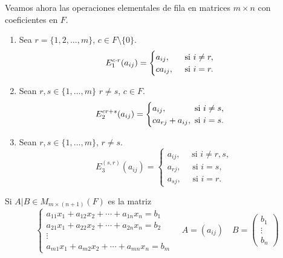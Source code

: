 \documentclass[12pt,a4paper]{book}
\begin{document}
    Veamos ahora las operaciones elementales de fila en matrices $m \times n$ con coeficientes en $F$.
    \begin{enumerate}
        \item Sea $r=\{1,2,\dots,m\}$, $c\in F\setminus\{0\}$.
        \begin{equation*}
            E_{1}^{c\cdot r}(a_{ij})=
            \begin{cases}
                a_{ij},\hfill\text{ si }i\neq r,\\
                ca_{ij},\quad\text{ si }i=r.
            \end{cases}
        \end{equation*} 
        \item Sean $r,s\in\{1,\dots,m\}$ $r\neq s$, $c\in F$.
        \begin{equation*}
            E_{2}^{cr+s}(a_{ij})=
            \begin{cases}
                a_{ij},\hfill\text{ si }i\neq s,\\
                ca_{rj}+a_{ij},\text{ si }i=s.
            \end{cases}
        \end{equation*}
        \item Sean $r,s\in\{1,\dots,m\}$, $r\neq s$.
        \begin{equation*}
            E_{3}^{(s,r)}(a_{ij})=
            \begin{cases}
                a_{ij},\quad\text{ si }i\neq r,s,\\
                a_{rj},\quad\text{ si }i=s,\\
                a_{sj},\quad\text{ si }i=r.
            \end{cases}
        \end{equation*}
    \end{enumerate}
    Si $A|B\in M_{m\times(n+1)}(F)$ es la matriz
    \begin{equation*}
        \begin{cases}
            a_{11}x_{1} + a_{12}x_{2} + \cdots + a_{1n}x_{n} = b_{1} \\
            a_{21}x_{1} + a_{22}x_{2} + \cdots + a_{2n}x_{n} = b_{2} \\
            \vdots \\
            a_{m1}x_{1} + a_{m2}x_{2} + \cdots + a_{mn}x_{n} = b_{m}
        \end{cases}
        \quad
        A=(a_{ij})
        \quad
        B=
        \begin{pmatrix}
            b_{1}\\
            \vdots\\
            b_{n}
        \end{pmatrix}
    \end{equation*}
\end{document}
